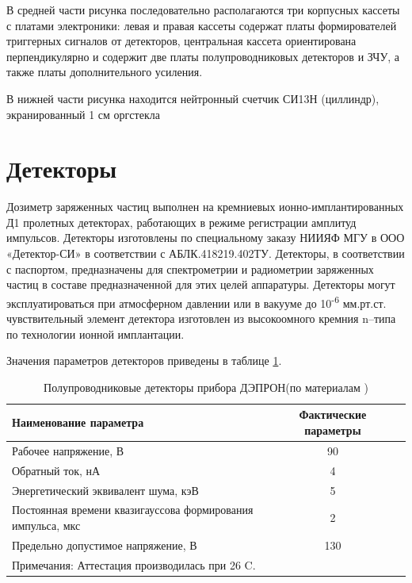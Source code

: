В средней части рисунка последовательно располагаются три корпусных кассеты с платами электроники: левая и правая кассеты содержат платы формирователей триггерных сигналов от детекторов, центральная кассета ориентирована перпендикулярно и содержит две платы полупроводниковых детекторов и ЗЧУ, а также платы дополнительного усиления.

В нижней части рисунка находится нейтронный счетчик СИ13Н (циллиндр), экранированный 1 см оргстекла

\section{Детекторы}

Дозиметр заряженных частиц выполнен на кремниевых ионно-имплантированных Д1 пролетных детекторах, работающих в режиме регистрации амплитуд импульсов. Детекторы изготовлены по специальному заказу НИИЯФ МГУ в ООО «Детектор-СИ» в соответствии с АБЛК.418219.402ТУ. Детекторы, в соответствии с паспортом, предназначены для спектрометрии и радиометрии заряженных частиц в составе предназначенной для этих целей аппаратуры. Детекторы могут эксплуатироваться при атмосферном давлении или в вакууме до 10\textsuperscript{-6} мм.рт.ст. чувствительный элемент детектора изготовлен из высокоомного кремния n--типа по технологии ионной имплантации.

Значения параметров детекторов приведены в таблице \ref{tab:detectors}.

\begin{table} 

	\begin{tabular}{p{10cm}|cc}
		Наименование параметра&Фактические параметры\\ \hline
		Рабочее напряжение, В&90&\\ Обратный ток, нА&4\\
		Энергетический эквивалент шума, кэВ&5\\
		Постоянная времени квазигауссова формирования импульса, мкс&2\\
		Предельно допустимое напряжение, В&130\\
		\multicolumn{2}{l}{Примечания: Аттестация производилась при 26 C.}\\
		
	\end{tabular} 
	\caption{Полупроводниковые детекторы прибора ДЭПРОН(по материалам )}
		\label{tab:detectors}
\end{table}
\todo{}

